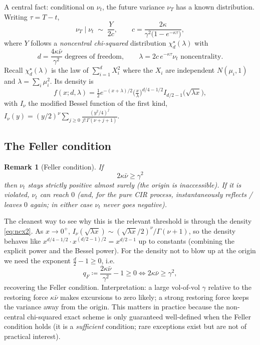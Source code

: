 \documentclass[11pt]{article}
\newtheorem{remark}{Remark}
\begin{document}
A central fact: conditional on $\nu_t$, the future variance $\nu_T$ has a known
distribution. Writing $\tau=T-t$,
\begin{equation}
\nu_T \mid \nu_t \;\sim\; \frac{Y}{2c},
\qquad
c = \frac{2\kappa}{\gamma^2\big(1-e^{-\kappa\tau}\big)},
\end{equation}
where $Y$ follows a \emph{noncentral chi-squared} distribution $\chi^{\star}_d(\lambda)$
with
\begin{equation}
d = \frac{4\kappa\bar\nu}{\gamma^2} \text{ degrees of freedom},
\qquad
\lambda = 2c\,e^{-\kappa\tau}\nu_t \text{ noncentrality}.
\end{equation}
Recall $\chi^\star_d(\lambda)$ is the law of $\sum_{i=1}^d X_i^2$ where the $X_i$ are
independent $N(\mu_i,1)$ and $\lambda=\sum_i\mu_i^2$. Its density is
\begin{equation}
f(x;d,\lambda) = \tfrac12 e^{-(x+\lambda)/2}
\Big(\tfrac{x}{\lambda}\Big)^{d/4-1/2}
I_{d/2-1}\!\big(\sqrt{\lambda x}\big),
\label{eq:ncx2}
\end{equation}
with $I_\nu$ the modified Bessel function of the first kind,
$I_\nu(y)=(y/2)^\nu\sum_{j\ge0}\frac{(y^2/4)^j}{j!\,\Gamma(\nu+j+1)}$.

\subsection{The Feller condition}

\begin{remark}[Feller condition]
If
\begin{equation}
2\kappa\bar\nu \ge \gamma^2
\end{equation}
then $\nu_t$ stays strictly positive almost surely (the origin is inaccessible). If it is
violated, $\nu_t$ can reach $0$ (and, for the pure CIR process, instantaneously reflects /
leaves $0$ again; in either case $\nu_t$ never goes negative).
\end{remark}

The cleanest way to see why this is the relevant threshold is through the density
\eqref{eq:ncx2}. As $x\to0^+$, $I_\nu(\sqrt{\lambda x})\sim (\sqrt{\lambda x}/2)^\nu/\Gamma(\nu+1)$,
so the density behaves like $x^{d/4-1/2}\cdot x^{(d/2-1)/2}=x^{d/2-1}$ up to constants
(combining the explicit power and the Bessel power). For the density not to blow up at the
origin we need the exponent $\tfrac{d}{2}-1\ge0$, i.e.
\begin{equation}
q_F \coloneqq \frac{2\kappa\bar\nu}{\gamma^2}-1 \ge 0
\iff 2\kappa\bar\nu\ge\gamma^2,
\end{equation}
recovering the Feller condition. Interpretation: a large vol-of-vol $\gamma$ relative to
the restoring force $\kappa\bar\nu$ makes excursions to zero likely; a strong restoring
force keeps the variance away from the origin. This matters in practice because the
non-central chi-squared exact scheme is only guaranteed well-defined when the Feller
condition holds (it is a \emph{sufficient} condition; rare exceptions exist but are not of
practical interest).
\end{document}
